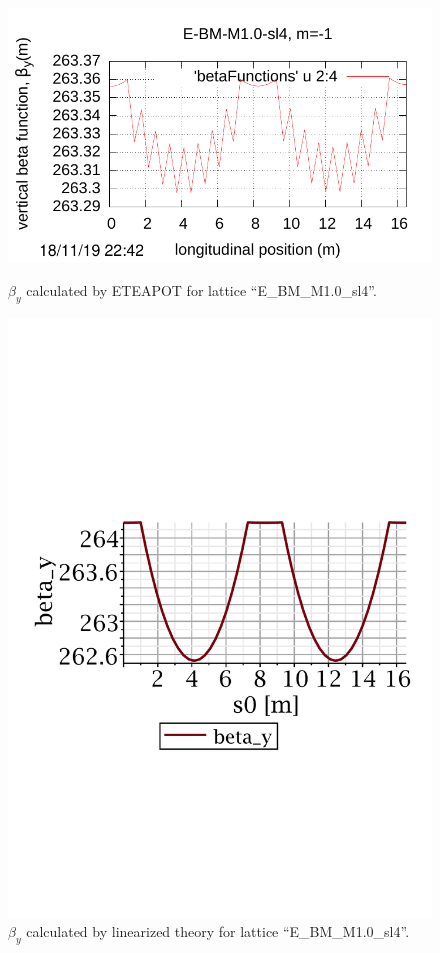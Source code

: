 \documentclass[]{article}
\begin{document}
\begin{figure}[htbp]
\hspace{-0.6cm}
\begin{minipage}[b]{0.49\linewidth}
\centering
\includegraphics[scale=0.6]{pdf/Fig_II-11.pdf}
\caption{$\beta_y$ calculated by ETEAPOT 
for lattice ``E\_BM\_M1.0\_sl4''.}
\label{fig:UAL_M1.0_betay}
\end{minipage}
%
%
\begin{minipage}[b]{0.49\linewidth}
\centering
\includegraphics[scale=0.45]{pdf/E_BM_M1p0_2-betay.pdf}
\caption{$\beta_y$ calculated by linearized 
theory for lattice ``E\_BM\_M1.0\_sl4''.}
\label{fig:RT_M1.0_betay}
\end{minipage}
\end{figure}
%
\end{document}
